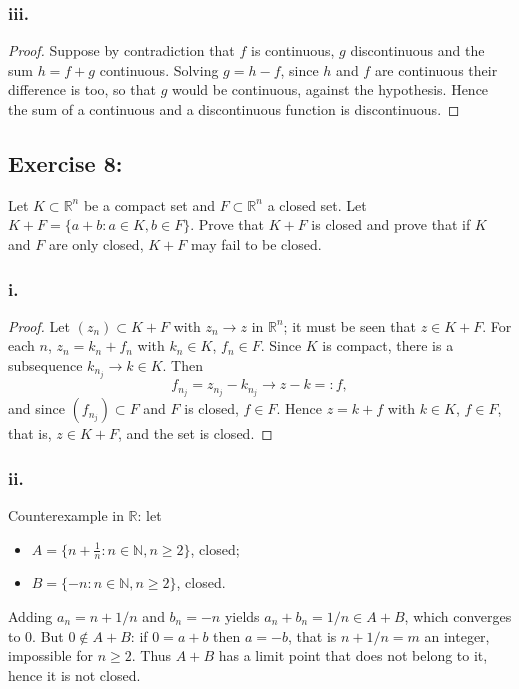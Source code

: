 \documentclass[11pt, a4paper]{article}
\begin{document}
\subsubsection*{iii.}
\begin{proof}
Suppose by contradiction that $f$ is continuous, $g$ discontinuous and the sum $h = f + g$ continuous.
Solving $g = h - f$, since $h$ and $f$ are continuous their difference is too, so that $g$ would be
continuous, against the hypothesis. Hence the sum of a continuous and a discontinuous function is discontinuous.
\end{proof}

\subsection*{Exercise 8:}

Let $K \subset \mathbb{R}^n$ be a compact set and $F \subset \mathbb{R}^n$ a closed set. Let
$K+F = \{a+b : a \in K, b \in F\}$.
Prove that $K+F$ is closed and prove that if $K$ and $F$ are only closed, $K+F$ may fail to be closed.

\subsubsection*{i.}
\begin{proof}
Let $(z_n) \subset K+F$ with $z_n \to z$ in $\mathbb{R}^n$; it must be seen that $z \in K+F$. For each $n$,
$z_n = k_n + f_n$ with $k_n \in K$, $f_n \in F$. Since $K$ is compact, there is a subsequence
$k_{n_j} \to k \in K$. Then
$$ f_{n_j} = z_{n_j} - k_{n_j} \to z - k =: f, $$
and since $(f_{n_j}) \subset F$ and $F$ is closed, $f \in F$. Hence $z = k + f$ with $k \in K$, $f \in F$,
that is, $z \in K+F$, and the set is closed.
\end{proof}

\subsubsection*{ii.}
Counterexample in $\mathbb{R}$: let
\begin{itemize}
    \item $A = \{n + \frac{1}{n} : n \in \mathbb{N}, n \ge 2\}$, closed;
    \item $B = \{-n : n \in \mathbb{N}, n \ge 2\}$, closed.
\end{itemize}
Adding $a_n = n + 1/n$ and $b_n = -n$ yields $a_n + b_n = 1/n \in A+B$, which converges to $0$. But
$0 \notin A+B$: if $0 = a + b$ then $a = -b$, that is $n + 1/n = m$ an integer, impossible for
$n \ge 2$. Thus $A+B$ has a limit point that does not belong to it, hence it is not closed.
\end{document}
